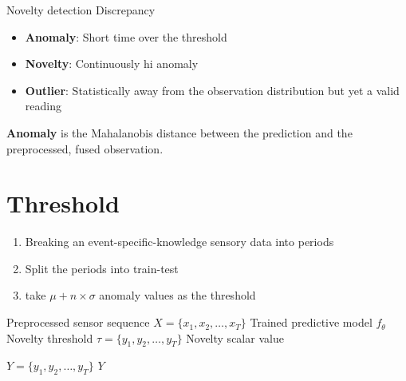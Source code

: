 \begin{frame}{Novelty detection}
    Discrepancy
    \begin{itemize}
        \item \textbf{Anomaly}: Short time over the threshold
        \item \textbf{Novelty}: Continuously hi anomaly
        \item \textbf{Outlier}: Statistically away from the observation distribution but yet a valid reading
    \end{itemize}
    
    \textbf{Anomaly} is the Mahalanobis distance between the prediction and the preprocessed, fused observation.
    
    
    \section{Threshold}
        \begin{enumerate}
            \item Breaking an event-specific-knowledge sensory data into periods
            \item Split the periods into train-test
            \item take $\mu + n \times \sigma$ anomaly values as the threshold
        \end{enumerate}
        
        \begin{algorithm}[H]
		\caption{Novelty Detection from Sensor Sequences}
        \begin{algorithmic}[1]
			\Require Preprocessed sensor sequence $X = \{x_1, x_2, \dots, x_T\}$
            \Require Trained predictive model $f_{\theta}$
            \Ensure Novelty threshold $\tau = \{y_1, y_2, \dots, y_T\}$
            \Ensure Novelty scalar value
            
            
            $Y = \{y_1, y_2, \dots, y_T\}$
            \State \Return $Y$
        \end{algorithmic}
        \end{algorithm}


\end{frame}